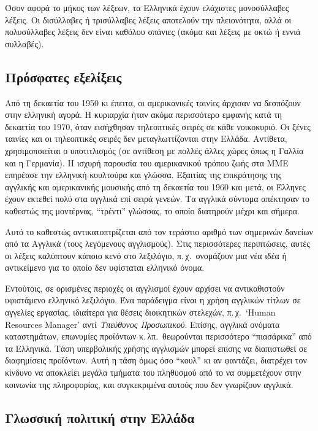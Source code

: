 \documentclass[]{../../metanetpaper}
\begin{document}
\begin{multicols}{2}
Όσον αφορά το μήκος των λέξεων, τα Ελληνικά έχουν ελάχιστες μονοσύλλαβες λέξεις. Οι δισύλλαβες ή τρισύλλαβες λέξεις αποτελούν την πλειονότητα, αλλά οι πολυσύλλαβες λέξεις δεν είναι καθόλου σπάνιες (ακόμα και λέξεις με οκτώ ή εννιά συλλαβές).

\subsection{Πρόσφατες εξελίξεις}

Από τη δεκαετία του 1950 κι έπειτα, οι αμερικανικές ταινίες άρχισαν να δεσπόζουν στην ελληνική αγορά. Η κυριαρχία ήταν ακόμα περισσότερο εμφανής κατά τη δεκαετία του 1970, όταν εισήχθησαν τηλεοπτικές σειρές σε κάθε νοικοκυριό. Οι ξένες ταινίες και οι τηλεοπτικές σειρές δεν μεταγλωττίζονται στην Ελλάδα. Αντίθετα, χρησιμοποιείται ο υποτιτλισμός (σε αντίθεση με πολλές άλλες χώρες όπως η Γαλλία και η Γερμανία). Η ισχυρή παρουσία του αμερικανικού τρόπου ζωής στα ΜΜΕ επηρέασε την ελληνική κουλτούρα και γλώσσα. Εξαιτίας της επικράτησης της αγγλικής και αμερικανικής μουσικής από τη δεκαετία του 1960 και μετά, οι Έλληνες έχουν εκτεθεί πολύ στα αγγλικά επί σειρά γενεών. Τα αγγλικά σύντομα απέκτησαν το καθεστώς της μοντέρνας, “τρέντι” γλώσσας, το οποίο διατηρούν μέχρι και σήμερα. 

Αυτό το καθεστώς αντικατοπτρίζεται από τον τεράστιο αριθμό των σημερινών δανείων από τα Αγγλικά (τους λεγόμενους αγγλισμούς). Στις περισσότερες περιπτώσεις, αυτές οι λέξεις καλύπτουν κάποιο κενό στο λεξιλόγιο, π.\,χ.~ονομάζουν μια νέα ιδέα ή αντικείμενο για το οποίο δεν υφίσταται ελληνικό όνομα.

Εντούτοις, σε ορισμένες περιοχές οι αγγλισμοί έχουν αρχίσει να αντικαθιστούν υφιστάμενο ελληνικό λεξιλόγιο. Ένα παράδειγμα είναι η χρήση αγγλικών τίτλων σε αγγελίες εργασίας, ιδιαίτερα για θέσεις διοικητικών στελεχών, π.\,χ.~`Human Resources Manager' αντί \textit{Υπεύθυνος Προσωπικού}. Επίσης, αγγλικά ονόματα καταστημάτων, επωνυμίες προϊόντων κ.\,λπ.~θεωρούνται περισσότερο “πιασάρικα” από τα Ελληνικά. Τάση υπερβολικής χρήσης αγγλισμών μπορεί επίσης να διαπιστωθεί σε διαφημίσεις προϊόντων. Αυτή η τάση όμως όσο “κουλ” κι αν φαντάζει, διατρέχει τον κίνδυνο να αποκλείει μεγάλα τμήματα του πληθυσμού από το να συμμετέχουν στην κοινωνία της πληροφορίας, και συγκεκριμένα αυτούς που δεν γνωρίζουν αγγλικά.

\subsection{Γλωσσική πολιτική στην Ελλάδα}


\end{multicols}
\end{document}
